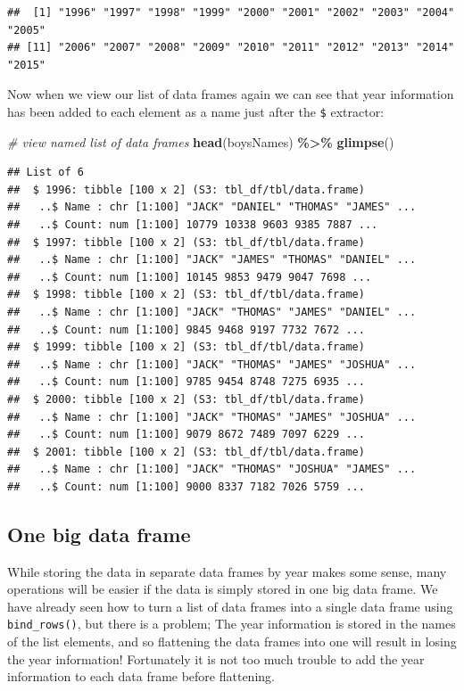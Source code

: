 \documentclass[
]{book}
\newenvironment{Shaded}{\begin{snugshade}}{\end{snugshade}}
\newcommand{\CommentTok}[1]{\textcolor[rgb]{0.56,0.35,0.01}{\textit{#1}}}
\newcommand{\KeywordTok}[1]{\textcolor[rgb]{0.13,0.29,0.53}{\textbf{#1}}}
\newcommand{\NormalTok}[1]{#1}
\newcommand{\OperatorTok}[1]{\textcolor[rgb]{0.81,0.36,0.00}{\textbf{#1}}}
\newcommand{\StringTok}[1]{\textcolor[rgb]{0.31,0.60,0.02}{#1}}
\begin{document}
\begin{verbatim}
##  [1] "1996" "1997" "1998" "1999" "2000" "2001" "2002" "2003" "2004" "2005"
## [11] "2006" "2007" "2008" "2009" "2010" "2011" "2012" "2013" "2014" "2015"
\end{verbatim}

Now when we view our list of data frames again we can see that year information has been added to each element as a name just after the \texttt{\$} extractor:

\begin{Shaded}
\begin{Highlighting}[]
\CommentTok{\# view named list of data frames}
\KeywordTok{head}\NormalTok{(boysNames) }\OperatorTok{\%\textgreater{}\%}\StringTok{ }\KeywordTok{glimpse}\NormalTok{() }
\end{Highlighting}
\end{Shaded}

\begin{verbatim}
## List of 6
##  $ 1996: tibble [100 x 2] (S3: tbl_df/tbl/data.frame)
##   ..$ Name : chr [1:100] "JACK" "DANIEL" "THOMAS" "JAMES" ...
##   ..$ Count: num [1:100] 10779 10338 9603 9385 7887 ...
##  $ 1997: tibble [100 x 2] (S3: tbl_df/tbl/data.frame)
##   ..$ Name : chr [1:100] "JACK" "JAMES" "THOMAS" "DANIEL" ...
##   ..$ Count: num [1:100] 10145 9853 9479 9047 7698 ...
##  $ 1998: tibble [100 x 2] (S3: tbl_df/tbl/data.frame)
##   ..$ Name : chr [1:100] "JACK" "THOMAS" "JAMES" "DANIEL" ...
##   ..$ Count: num [1:100] 9845 9468 9197 7732 7672 ...
##  $ 1999: tibble [100 x 2] (S3: tbl_df/tbl/data.frame)
##   ..$ Name : chr [1:100] "JACK" "THOMAS" "JAMES" "JOSHUA" ...
##   ..$ Count: num [1:100] 9785 9454 8748 7275 6935 ...
##  $ 2000: tibble [100 x 2] (S3: tbl_df/tbl/data.frame)
##   ..$ Name : chr [1:100] "JACK" "THOMAS" "JAMES" "JOSHUA" ...
##   ..$ Count: num [1:100] 9079 8672 7489 7097 6229 ...
##  $ 2001: tibble [100 x 2] (S3: tbl_df/tbl/data.frame)
##   ..$ Name : chr [1:100] "JACK" "THOMAS" "JOSHUA" "JAMES" ...
##   ..$ Count: num [1:100] 9000 8337 7182 7026 5759 ...
\end{verbatim}

\hypertarget{one-big-data-frame}{%
\subsection{One big data frame}\label{one-big-data-frame}}

While storing the data in separate data frames by year makes some sense, many operations will be easier if the data is simply stored in one big data frame. We have already seen how to turn a list of data frames into a single data frame using \texttt{bind\_rows()}, but there is a problem; The year information is stored in the names of the list elements, and so flattening the data frames into one will result in losing the year information! Fortunately it is not too much trouble to add the year information to each data frame before flattening.
\end{document}
